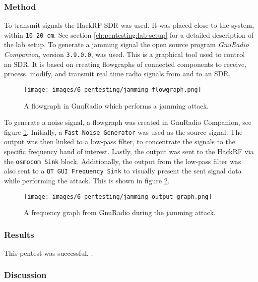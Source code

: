 \subsubsection{Method}
To transmit signals the HackRF SDR was used. It was placed close to the system, within \texttt{10-20 cm}. See section \ref{ch:pentesting:lab-setup} for a detailed description of the lab setup. To generate a jamming signal the open source program \textit{GnuRadio Companion}, version \texttt{3.9.0.0}, was used. This is a graphical tool used to control an SDR. It is based on creating flowgraphs of connected components to receive, process, modify, and transmit real time radio signals from and to an SDR.
\begin{figure}[!ht]
    \centering
    \texttt{[image: images/6-pentesting/jamming-flowgraph.png]}
    \caption{A flowgraph in GnuRadio which performs a jamming attack.}
    \label{fig:gnuradio-jamming-flowgraph}
\end{figure}
To generate a noise signal, a flowgraph was created in GnuRadio Companion, see figure \ref{fig:gnuradio-jamming-flowgraph}. Initially, a \texttt{Fast Noise Generator} was used as the source signal. The output was then linked to a low-pass filter, to concentrate the signals to the specific frequency band of interest. Lastly, the output was sent to the HackRF via the \texttt{osmocom Sink} block. Additionally, the output from the low-pass filter was also sent to a \texttt{QT GUI Frequency Sink} to visually present the sent signal data while performing the attack. This is shown in figure \ref{fig:gnuradio-frequency-graph}.
\begin{figure}[!ht]
    \centering
    \texttt{[image: images/6-pentesting/jamming-output-graph.png]}
    \caption{A frequency graph from GnuRadio during the jamming attack.}
    \label{fig:gnuradio-frequency-graph}
\end{figure}

\subsubsection{Results}
This pentest was successful. \todo.

\subsubsection{Discussion}
\todo
